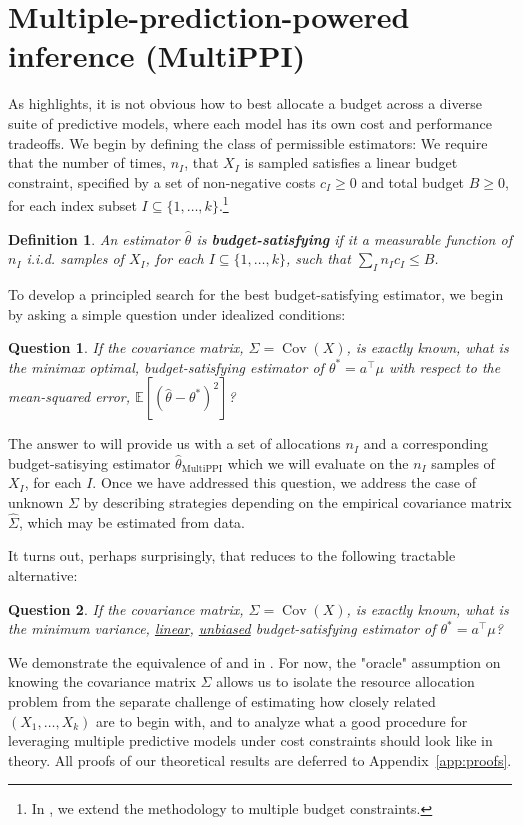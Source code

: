 \documentclass{article} %
\newcommand{\Ex}{\mathbb{E}}
\DeclareMathOperator{\Cov}{Cov}
\DeclareMathOperator{\multiPPI}{MultiPPI}
\newtheorem{definition}[theorem]{Definition}
\newtheorem{question}{Question}
\newcommand{\wh}[1]{\widehat{#1}}
\begin{document}
\section{Multiple-prediction-powered inference (MultiPPI)}\label{sec:methods}
As  highlights, it is not obvious how to best allocate a budget across a diverse suite of predictive models, where each model has its own cost and performance tradeoffs. We begin by defining the class of permissible estimators: We require that the number of times, $n_I$, that $X_I$ is sampled satisfies a linear budget constraint, specified by a set of non-negative costs $c_I\geq0$ and total budget $B\geq0$, for each index subset $I\subseteq\{1,\dots,k\}$.\footnote{In , we extend the methodology to multiple budget constraints.}
\begin{definition}
\label{def:budget}
    An estimator $\hat{\theta}$ is \textbf{budget-satisfying} if it a measurable function of $n_I$ i.i.d. samples of $X_I$, for each $I\subseteq\{1,\dots,k\}$, such that $\sum_{I} n_Ic_I \leq B$.
\end{definition}
To develop a principled search for the best budget-satisfying estimator, we begin by asking a simple question under idealized conditions:
\begin{question}
\label{eqn:minimax}
    If the  covariance matrix, $\Sigma = \Cov(X)$, is exactly  known, what is the minimax optimal, budget-satisfying estimator of $\theta^* = a^\top\mu$ with respect to the mean-squared error, $\Ex[(\hat{\theta} - \theta^*)^2]$?
\end{question}
The answer to  will provide us with a set of allocations $n_I$ and a corresponding budget-satisying estimator $\hat{\theta}_{\multiPPI}$ which we will evaluate on the $n_I$ samples of $X_I$, for each $I$. Once we have addressed this question, we address the case of unknown $\Sigma$ by describing strategies depending on the empirical covariance matrix $\wh{\Sigma}$, which may be estimated from data.

It turns out, perhaps surprisingly, that  reduces to the following tractable alternative:
\begin{question}
\label{eqn:linear}
If the  covariance matrix, $\Sigma = \Cov(X)$, is exactly  known, what is the minimum variance, \underline{linear}, \underline{unbiased} budget-satisfying estimator of $\theta^*= a^\top\mu$?
\end{question}
We demonstrate the equivalence of  and  in . For now, the "oracle" assumption on knowing the covariance matrix $\Sigma$  allows us to isolate the resource allocation problem from the separate challenge of estimating how closely related  $(X_1, \ldots, X_k)$ are to begin with, and to analyze what a good procedure for leveraging multiple predictive models under cost constraints should look like in theory. All proofs of our theoretical results are deferred to Appendix~\ref{app:proofs}.
\end{document}
